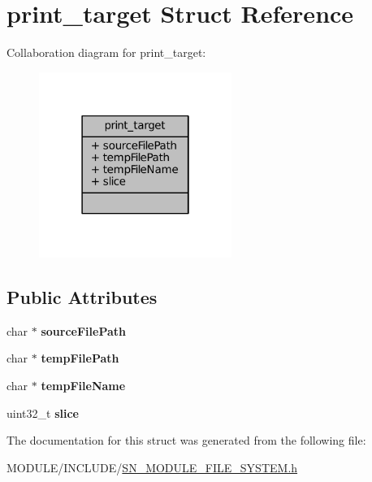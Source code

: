 \hypertarget{structprint__target}{}\section{print\+\_\+target Struct Reference}
\label{structprint__target}


Collaboration diagram for print\+\_\+target\+:\nopagebreak
\begin{figure}[H]
\begin{center}
\leavevmode
\includegraphics[width=178pt]{structprint__target__coll__graph}
\end{center}
\end{figure}
\subsection*{Public Attributes}
\begin{DoxyCompactItemize}
\item 
\mbox{\label{structprint__target_a75e27844f21758e7f508b5f2c4c544d9}} 
char $\ast$ {\bfseries source\+File\+Path}
\item 
\mbox{\label{structprint__target_a395b90e3d7d8d99ffd61a39fd184045a}} 
char $\ast$ {\bfseries temp\+File\+Path}
\item 
\mbox{\label{structprint__target_aad324aae62828dd19ca1cedcad483197}} 
char $\ast$ {\bfseries temp\+File\+Name}
\item 
\mbox{\label{structprint__target_a6292abff78160dbcf43920e125c641c9}} 
uint32\+\_\+t {\bfseries slice}
\end{DoxyCompactItemize}


The documentation for this struct was generated from the following file\+:\begin{DoxyCompactItemize}
\item 
M\+O\+D\+U\+L\+E/\+I\+N\+C\+L\+U\+D\+E/\hyperlink{SN__MODULE__FILE__SYSTEM_8h}{S\+N\+\_\+\+M\+O\+D\+U\+L\+E\+\_\+\+F\+I\+L\+E\+\_\+\+S\+Y\+S\+T\+E\+M.\+h}\end{DoxyCompactItemize}
